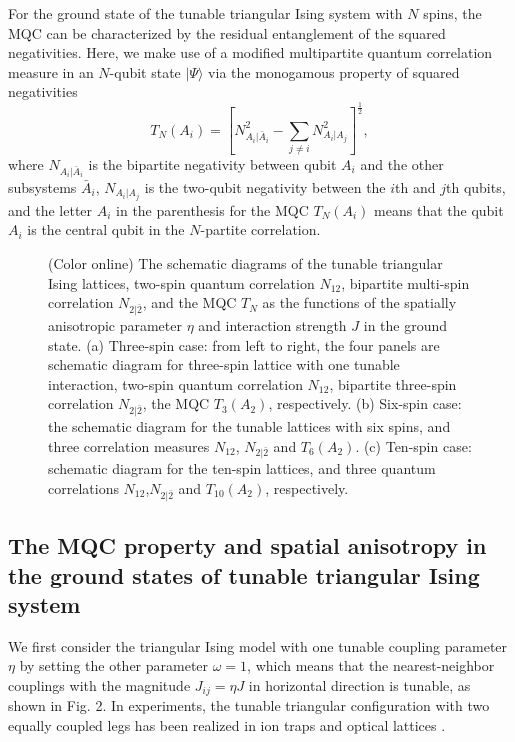 \documentclass[pra,aps,twocolumn,showpacs]{revtex4}
\newcommand{\ket}[1]{|#1\rangle}
\begin{document}
For the ground state of the tunable triangular Ising system with $N$ spins, the MQC can be characterized by the residual entanglement of the squared negativities. Here, we make use of a modified multipartite quantum correlation measure in an $N$-qubit state $\ket{\Psi}$ via the monogamous property of squared negativities
\begin{equation}
	T_{N}(A_i)=[N_{A_i|\bar{A}_i}^{2}-\sum_{j\neq i}N_{A_i|A_j}^{2}]^{\frac{1}{2}},
\end{equation}
where $N_{A_i|\bar{A}_i}$ is the bipartite negativity between qubit $A_i$ and the other subsystems $\bar{A}_i$, $N_{A_i|A_j}$ is the two-qubit negativity between the $i$th and $j$th qubits, and the letter $A_i$ in the parenthesis for the MQC $T_N(A_i)$ means that the qubit $A_i$ is the central qubit in the $N$-partite correlation.



\begin{figure}
	\caption{(Color online) The schematic diagrams of the tunable triangular Ising lattices, two-spin quantum correlation $N_{12}$, bipartite multi-spin correlation $N_{2|\bar{2}}$, and the MQC $T_N$ as the functions of the spatially anisotropic parameter $\eta$ and interaction strength $J$ in the ground state. (a) Three-spin case: from left to right, the four panels are schematic diagram for three-spin lattice with one tunable interaction, two-spin quantum correlation $N_{12}$, bipartite three-spin correlation $N_{2|\bar{2}}$, the MQC $T_3(A_2)$, respectively. (b) Six-spin case: the schematic diagram for the tunable lattices with six spins, and three correlation measures $N_{12}$, $N_{2|\bar{2}}$ and $T_6(A_2)$. (c) Ten-spin case: schematic diagram for the ten-spin lattices, and three quantum correlations $N_{12}$,$N_{2|\bar{2}}$ and $T_{10}(A_2)$, respectively.}
\end{figure}

\subsection{The MQC property and spatial anisotropy in the ground states of tunable triangular Ising system}

We first consider the triangular Ising model with one tunable coupling parameter $\eta$ by setting the other parameter $\omega=1$, which means that the nearest-neighbor couplings with the magnitude $J_{ij}=\eta J$ in horizontal direction is tunable, as shown in Fig. 2. In experiments, the tunable triangular configuration with two equally coupled legs has been realized in ion traps \cite{kim10nat} and optical lattices \cite{Struck11sci}.
\end{document}
